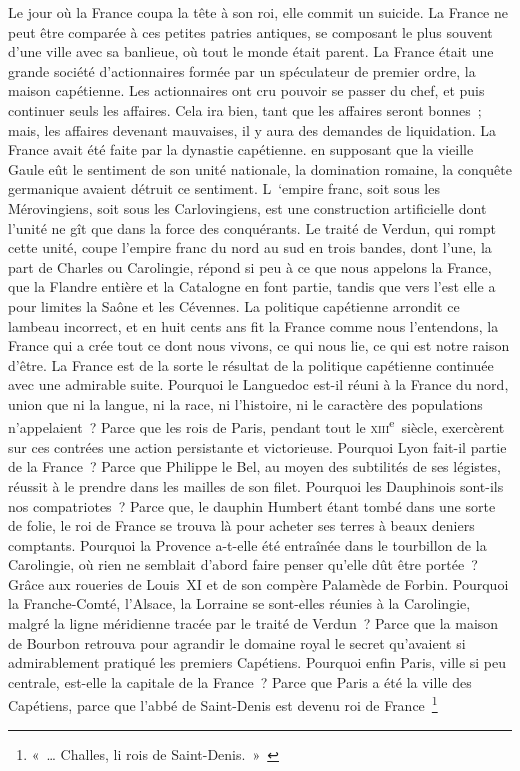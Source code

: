 \documentclass[french,twoside]{book} %
\begin{document}
Le jour où la France coupa la tête à son roi, elle commit un suicide. La France ne peut être comparée à ces petites patries antiques, se composant le plus souvent d’une ville avec sa banlieue, où tout le monde était parent. La France était une grande société d’actionnaires formée par un spéculateur de premier ordre, la maison capétienne. Les actionnaires ont cru pouvoir se passer du chef, et puis continuer seuls les affaires. Cela ira bien, tant que les affaires seront bonnes ; mais, les affaires devenant mauvaises, il y aura des demandes de liquidation. La France avait été faite par la dynastie capétienne. en supposant que la vieille Gaule eût le sentiment de son unité nationale, la domination romaine, la conquête germanique avaient détruit ce sentiment. L ‘empire franc, soit sous les Mérovingiens, soit sous les Carlovingiens, est une construction artificielle dont l’unité ne gît que dans la force des conquérants. Le traité de Verdun, qui rompt cette unité, coupe l’empire franc du nord au sud en trois bandes, dont l’une, la part de Charles ou Carolingie, répond si peu à ce que nous appelons la France, que la Flandre entière et la Catalogne en font partie, tandis que vers l’est elle a pour limites la Saône et les Cévennes. La politique capétienne arrondit ce lambeau incorrect, et en huit cents ans fit la France comme nous l’entendons, la France qui a crée tout ce dont nous vivons, ce qui nous lie, ce qui est notre raison d’être. La France est de la sorte le résultat de la politique capétienne continuée avec une admirable suite. Pourquoi le Languedoc est-il réuni à la France du nord, union que ni la langue, ni la race, ni l’histoire, ni le caractère des populations n’appelaient ? Parce que les rois de Paris, pendant tout le \textsc{xiii}\textsuperscript{e} siècle, exercèrent sur ces contrées une action persistante et victorieuse. Pourquoi Lyon fait-il partie de la France ? Parce que Philippe le Bel, au moyen des subtilités de ses légistes, réussit à le prendre dans les mailles de son filet. Pourquoi les Dauphinois sont-ils nos compatriotes ? Parce que, le dauphin Humbert étant tombé dans une sorte de folie, le roi de France se trouva là pour acheter ses terres à beaux deniers comptants. Pourquoi la Provence a-t-elle été entraînée dans le tourbillon de la Carolingie, où rien ne semblait d’abord faire penser qu’elle dût être portée ? Grâce aux roueries de Louis XI et de son compère Palamède de Forbin. Pourquoi la Franche-Comté, l’Alsace, la Lorraine se sont-elles réunies à la Carolingie, malgré la ligne méridienne tracée par le traité de Verdun ? Parce que la maison de Bourbon retrouva pour agrandir le domaine royal le secret qu’avaient si admirablement pratiqué les premiers Capétiens. Pourquoi enfin Paris, ville si peu centrale, est-elle la capitale de la France ? Parce que Paris a été la ville des Capétiens, parce que l’abbé de Saint-Denis est devenu roi de France \footnote{ \noindent « … Challes, li rois de Saint-Denis. » \par
 
}
\end{document}
